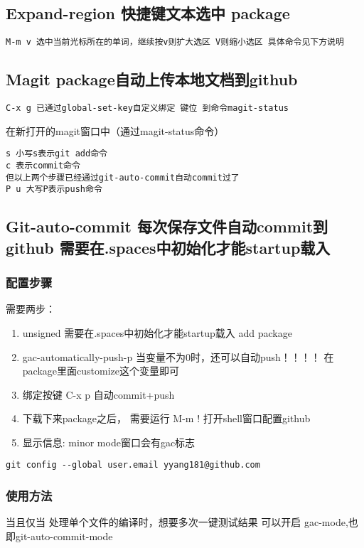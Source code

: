 \documentclass[11pt]{article}
\begin{document}
\subsection{Expand-region 快捷键文本选中 package}
\label{sec:org139cec7}
\begin{verbatim}
M-m v 选中当前光标所在的单词，继续按v则扩大选区 V则缩小选区 具体命令见下方说明
\end{verbatim}
\subsection{Magit package自动上传本地文档到github}
\label{sec:org7f9c040}
\begin{verbatim}
C-x g 已通过global-set-key自定义绑定 键位 到命令magit-status
\end{verbatim}
在新打开的magit窗口中（通过magit-status命令）
\begin{verbatim}
s 小写s表示git add命令
c 表示commit命令
但以上两个步骤已经通过git-auto-commit自动commit过了
P u 大写P表示push命令
\end{verbatim}
\subsection{Git-auto-commit 每次保存文件自动commit到github 需要在.spaces中初始化才能startup载入}
\label{sec:orgfecd71a}
\subsubsection{配置步骤}
\label{sec:org7a68def}
需要两步：
\begin{enumerate}
\item unsigned 需要在.spaces中初始化才能startup载入 add package
\item gac-automatically-push-p 当变量不为0时，还可以自动push！！！！ 在package里面customize这个变量即可
\item 绑定按键 C-x p 自动commit+push
\item 下载下来package之后， 需要运行 M-m ! 打开shell窗口配置github
\item 显示信息: minor mode窗口会有gac标志
\end{enumerate}
\begin{verbatim}
git config --global user.email yyang181@github.com
\end{verbatim}
\subsubsection{使用方法}
\label{sec:org796a858}
当且仅当 处理单个文件的编译时，想要多次一键测试结果 可以开启 gac-mode,也即git-auto-commit-mode
\end{document}
